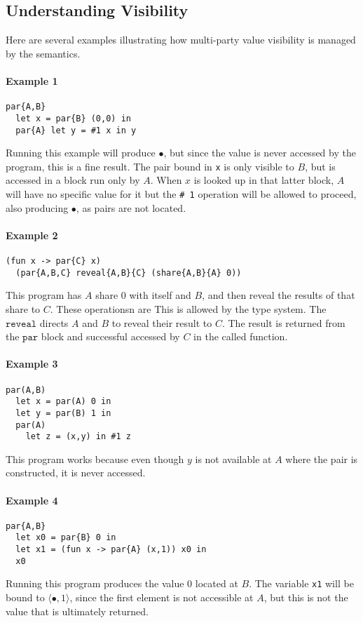\documentclass[10pt]{article}
\newcommand{\kw}[1]{\ensuremath{\mathtt{#1}}}
\newcommand{\epair}[2]{\ensuremath{\langle {#1}, {#2} \rangle}}
\newcommand{\vcrash}{\ensuremath{\bullet}}
\begin{document}
\subsection{Understanding Visibility}
\label{sec:vis}

Here are several examples illustrating how multi-party value
visibility is managed by the semantics.

\paragraph{Example 1}
\begin{verbatim}
par{A,B}
  let x = par{B} (0,0) in
  par{A} let y = #1 x in y
\end{verbatim}
Running this example will produce $\vcrash$, but since the value is never accessed by the program,
this is a fine result. The pair bound in \texttt{x} is only visible to
$B$, but is accessed in a block run only by $A$. When $x$ is looked up
in that latter block, $A$ will have no specific value for it but the
\texttt{\# 1} operation will be allowed to proceed, also producing
$\vcrash$, as pairs are not located.

\paragraph{Example 2}
\begin{verbatim}
(fun x -> par{C} x) 
  (par{A,B,C} reveal{A,B}{C} (share{A,B}{A} 0))
\end{verbatim}
This program has $A$ share $0$ with itself and $B$, and then reveal
the results of that share to $C$. These operationsn are 
This is allowed by the type system. The $\kw{reveal}$ directs $A$ and
$B$ to reveal their result to $C$. The result is returned from the
$\kw{par}$ block and successful accessed by $C$ in the called function.

\paragraph{Example 3}
\begin{verbatim}
par(A,B) 
  let x = par(A) 0 in
  let y = par(B) 1 in
  par(A) 
    let z = (x,y) in #1 z
\end{verbatim}
This program works because even though $y$ is not available at $A$
where the pair is constructed, it is never accessed.

\paragraph{Example 4}
\begin{verbatim}
par{A,B}
  let x0 = par{B} 0 in
  let x1 = (fun x -> par{A} (x,1)) x0 in
  x0
\end{verbatim}
Running this program produces the value $0$ located at $B$. The
variable \texttt{x1} will be bound to $\epair{\vcrash}{1}$, since the
first element is not accessible at $A$, but this is not the value that
is ultimately returned.
\end{document}
